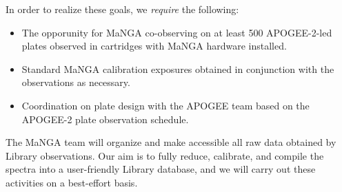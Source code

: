\documentclass[preprint,11pt]{aastex}
\begin{document}
\noindent In order to realize these goals, we {\em require} the following:

\begin{itemize}

\item The opporunity for MaNGA co-observing on at least 500 APOGEE-2-led plates observed in cartridges with MaNGA hardware installed.

\item Standard MaNGA calibration exposures obtained in conjunction with the observations as necessary.

\item Coordination on plate design with the APOGEE team based on the APOGEE-2 plate observation schedule.

\end{itemize}

The MaNGA team will organize and make accessible all raw data obtained by Library observations.  Our aim is to fully reduce, calibrate, and
compile the spectra into a user-friendly Library database, and we will carry out these activities on a best-effort basis.




\end{document}

